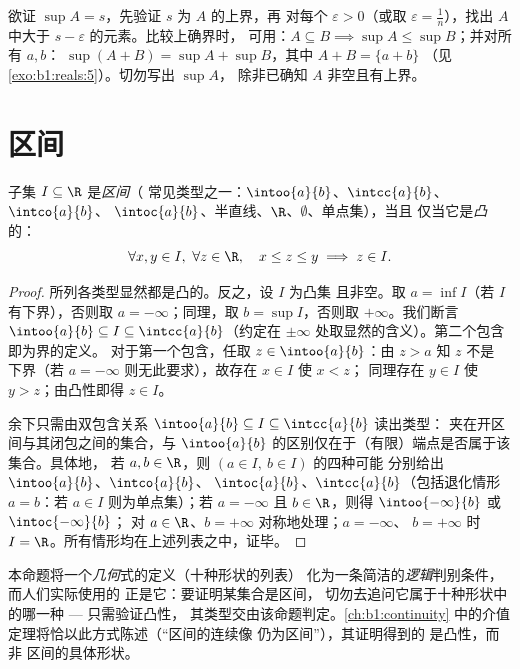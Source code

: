 \begin{method}[用上确界与下确界证明等式]\label{met:b1:reals:supproofs}
欲证 $\sup A = s$，先验证 $s$ 为 $A$ 的上界，再
对每个 $\varepsilon > 0$（或取 $\varepsilon = \frac
1n$），找出 $A$ 中大于 $s - \varepsilon$ 的元素。比较上确界时，
可用：$A \subseteq B \implies \sup A \leq \sup B$；并对所有 $a, b$：
$\sup(A + B) = \sup A + \sup B$，其中 $A + B = \{a + b\}$
（见\cref{exo:b1:reals:5}）。切勿写出 $\sup A$，
除非已确知 $A$ 非空且有上界。
\end{method}

\section{区间}

\begin{proposition}[区间的刻画]\label{prop:b1:reals:intervals}
子集 $I \subseteq \R$ 是\emph{区间}（
常见类型之一：$\intoo{a}{b}$、$\intcc{a}{b}$、$\intco{a}{b}$、
$\intoc{a}{b}$、半直线、$\R$、$\emptyset$、单点集），当且
仅当它是\emph{凸}的：
\[
\forall x, y \in I,\ \forall z \in \R, \quad
x \leq z \leq y \implies z \in I .
\]
\end{proposition}

\begin{proof}
所列各类型显然都是凸的。反之，设 $I$ 为凸集
且非空。取 $a = \inf I$（若 $I$ 有下界），否则取 $a =
-\infty$；同理，取 $b = \sup I$，否则取 $+\infty$。我们断言 $\intoo{a}{b}
\subseteq I \subseteq \intcc{a}{b}$（约定在
$\pm\infty$ 处取显然的含义）。第二个包含即为界的定义。
对于第一个包含，任取 $z \in \intoo{a}{b}$：由 $z > a$ 知 $z$ 不是
下界（若 $a = -\infty$ 则无此要求），故存在 $x \in I$ 使 $x < z$；
同理存在 $y \in I$ 使 $y > z$；由凸性即得 $z \in I$。

余下只需由双包含关系
$\intoo{a}{b} \subseteq I \subseteq \intcc{a}{b}$ 读出类型：
夹在开区间与其闭包之间的集合，与
$\intoo{a}{b}$ 的区别仅在于（有限）端点是否属于该集合。具体地，
若 $a, b \in \R$，则 $(a \in I,\ b \in I)$ 的四种可能
分别给出 $\intoo{a}{b}$、$\intco{a}{b}$、
$\intoc{a}{b}$、$\intcc{a}{b}$（包括退化情形
$a = b$：若 $a \in I$ 则为单点集）；若 $a = -\infty$ 且 $b \in
\R$，则得 $\intoo{-\infty}{b}$ 或 $\intoc{-\infty}{b}$；
对 $a \in \R$、$b = +\infty$ 对称地处理；$a = -\infty$、
$b = +\infty$ 时 $I = \R$。所有情形均在上述列表之中，证毕。
\end{proof}

\begin{remark}[为何凸性是正确的判别准则]
本命题将一个\emph{几何}式的定义（十种形状的列表）
化为一条简洁的\emph{逻辑}判别条件，而人们实际使用的
正是它：要证明某集合是区间，
切勿去追问它属于十种形状中的哪一种 --- 只需验证凸性，
其类型交由该命题判定。\cref{ch:b1:continuity} 中的介值
定理将恰以此方式陈述（“区间的连续像
仍为区间”），其证明得到的
是凸性，而非
区间的具体形状。
\end{remark}

